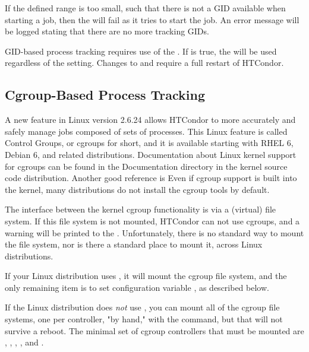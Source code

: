 If the defined range is too small, such that there is not a GID available
when starting a job,
then the  will fail as it tries to start the job.
An error message will be logged stating that there are no more tracking GIDs.

GID-based process tracking requires use of the . If
 is true, the  will
be used regardless of the  setting.  Changes to
 and  require
a full restart of HTCondor.

\subsection{\label{sec:CGroupTracking}Cgroup-Based Process Tracking} 

A new feature in Linux version 2.6.24 allows HTCondor to more accurately 
and safely manage jobs composed of sets of processes.  This Linux 
feature is called Control Groups, or cgroups for short, and it is 
available starting with RHEL 6, Debian 6, and related distributions.  
Documentation about Linux kernel support for cgroups can be found 
in the Documentation directory in the kernel source code distribution.
Another good reference is 
Even if cgroup support is built into the kernel, 
many distributions do not install the cgroup tools by default.

The interface between the kernel cgroup functionality is via a (virtual) 
file system.  
If this file system is not mounted, 
HTCondor can not use cgroups, 
and a warning will be printed to the . 
Unfortunately, there is no standard way to mount 
the file system, nor is there a standard place to mount it,
across Linux distributions.  

If your Linux distribution uses , 
it will mount the cgroup file system, 
and the only remaining item is to set configuration variable
, as described below.

If the Linux distribution does \emph{not} use , 
you can mount all of the cgroup file systems, 
one per controller, "by hand,"
with the  command, 
but that will not survive a reboot.
The minimal set of cgroup controllers that must be mounted are 
, , , , and .

